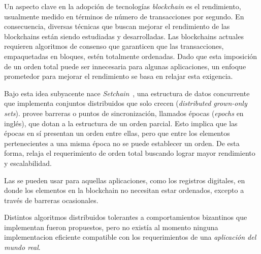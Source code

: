   Un aspecto clave en la adopción de tecnologías \textit{blockchain} es el rendimiento,
  usualmente medido en términos de número de transacciones por segundo.
  En consecuencia, diversas técnicas que buscan mejorar el rendimiento de las blockchains
  están siendo estudiadas y desarrolladas.
  Las blockchains actuales requieren algoritmos de consenso que garanticen que las
  transacciones, empaquetadas en bloques, estén totalmente ordenadas.
  Dado que esta imposición de un orden total puede ser innecesaria para algunas aplicaciones,
  un enfoque prometedor para mejorar el rendimiento se basa en relajar esta exigencia.

  Bajo esta idea subyacente nace \textit{Setchain}~\cite{Capretto.2022.Setchain}, una estructura de
  datos concurrente que implementa conjuntos distribuidos que solo crecen
  (\textit{distributed grown-only sets}).
  \setchain provee barreras o puntos de sincronización,
  llamados épocas (\textit{epochs} en inglés), que dotan a la estructura de un orden parcial.
  Esto implica que las épocas en sí presentan un orden entre ellas,
  pero que entre los elementos pertenecientes a una misma época no
  se puede establecer un orden.
  De esta forma, relaja el requerimiento de orden total buscando lograr mayor
  rendimiento y escalabilidad.
  

  Las \setchains se pueden usar para aquellas aplicaciones, como los registros digitales,
  en donde los elementos en la blockchain no necesitan estar ordenados, excepto a través
  de barreras ocasionales.
  
  
  Distintos algoritmos distribuidos tolerantes a comportamientos bizantinos que
  implementan \setchain fueron propuestos, pero no existía al momento ninguna
  implementacion eficiente compatible con
  los requerimientos de una \textit{aplicación del mundo real}.
  
